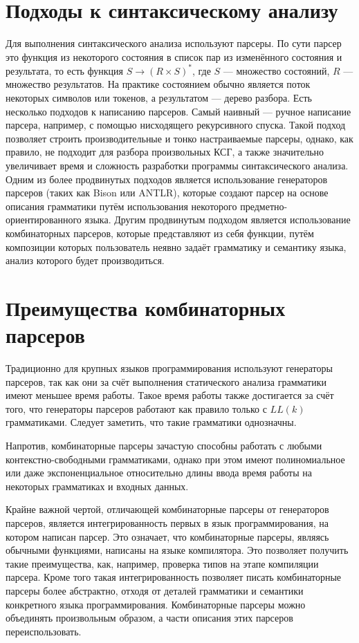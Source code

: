 \documentclass[times]{itmo-student-thesis}
\begin{document}
\section{Подходы к синтаксическому анализу}\label{sec:parsing_approaches}

Для выполнения синтаксического анализа используют парсеры. По сути парсер это функция из некоторого состояния в
список пар из изменённого состояния и результата, то есть функция $S \rightarrow (R \times S)^*$, где $S$
--- множество состояний, $R$ --- множество результатов. На практике состоянием обычно является поток
некоторых символов или токенов, а результатом --- дерево разбора. Есть несколько подходов к написанию парсеров. Самый
наивный --- ручное написание парсера, например, с помощью нисходящего рекурсивного спуска. Такой подход позволяет
строить производительные и тонко настраиваемые парсеры, однако, как правило, не подходит для разбора произвольных КСГ,
а также значительно увеличивает время и сложность разработки программы синтаксического анализа. Одним из более
продвинутых подходов является использование генераторов парсеров (таких как Bison\cite{bison} или
ANTLR\cite{antlr}), которые создают парсер на основе описания грамматики путём использования некоторого
предметно-ориентированного языка. Другим продвинутым подходом является использование комбинаторных парсеров, которые
представляют из себя функции, путём композиции которых пользователь неявно задаёт грамматику и семантику языка, анализ
которого будет производиться.

\section{Преимущества комбинаторных парсеров}\label{sec:parser_combinators_advantages}

Традиционно для крупных языков программирования используют генераторы парсеров, так как они за счёт выполнения
статического анализа грамматики имеют меньшее время работы. Такое время работы также достигается за счёт того, что
генераторы парсеров работают как правило только с $LL(k)$ грамматиками. Следует заметить, что такие
грамматики однозначны.

Напротив, комбинаторные парсеры зачастую способны работать с любыми контекстно-свободными грамматиками, однако при этом
имеют полиномиальное или даже экспоненциальное относительно длины ввода время работы на некоторых грамматиках и входных
данных.

Крайне важной чертой, отличающей  комбинаторные парсеры от генераторов парсеров, является интегрированность первых в
язык программирования, на котором написан парсер. Это означает, что комбинаторные парсеры, являясь обычными функциями,
написаны на языке компилятора. Это позволяет получить такие преимущества, как, например, проверка типов на этапе
компиляции парсера. Кроме того такая интегрированность позволяет писать комбинаторные парсеры более абстрактно, отходя
от деталей грамматики и семантики конкретного языка программирования. Комбинаторные парсеры можно объединять
произвольным образом, а части описания этих парсеров переиспользовать.
\end{document}
